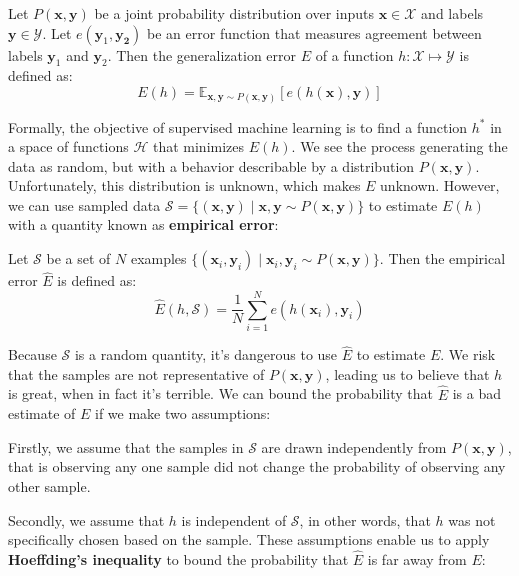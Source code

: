 \begin{definition} \label{generalisation_error}
	Let $P(\mathbf{x}, \mathbf{y})$ be a joint probability distribution over inputs $\mathbf{x} \in \mathcal{X}$ and labels $\mathbf{y} \in \mathcal{Y}$. Let $e(\mathbf{y}_1, \mathbf{y_2})$ be an error function that measures agreement between labels $\mathbf{y}_1$ and $\mathbf{y}_2$. Then the generalization error $E$ of a function $h: \mathcal{X} \mapsto \mathcal{Y}$ is defined as:
	$$
		E(h) = \mathbb{E}_{\mathbf{x},\mathbf{y}\sim P(\mathbf{x}, \mathbf{y})}[e(h(\mathbf{x}), \mathbf{y})]
	$$
\end{definition}
Formally, the objective of supervised machine learning is to find a function $h^*$ in a space of functions $\mathcal{H}$ that minimizes $E(h)$. We see the process generating the data as random, but with a behavior describable by a distribution $P(\mathbf{x}, \mathbf{y})$. Unfortunately, this distribution is unknown, which makes $E$ unknown. However, we can use sampled data $\mathcal{S} = \{(\mathbf{x}, \mathbf{y}) \mid \mathbf{x}, \mathbf{y} \sim P(\mathbf{x}, \mathbf{y})\}$ to estimate $E(h)$ with a quantity known as \textbf{empirical error}:

\begin{definition} \label{empirical_error}
	Let $\mathcal{S}$ be a set of $N$ examples $\{(\mathbf{x}_i, \mathbf{y}_i) \mid \mathbf{x}_i, \mathbf{y}_i \sim P(\mathbf{x}, \mathbf{y})\}$. Then the empirical error $\hat{E}$ is defined as:
	$$
		\hat{E}(h, \mathcal{S}) = \frac{1}{N}\sum\limits_{i=1}^N e(h(\mathbf{x}_i), \mathbf{y}_i)
	$$
\end{definition}

Because $\mathcal{S}$ is a random quantity, it's dangerous to use $\hat{E}$ to estimate $E$. We risk that the samples are not representative of $P(\mathbf{x}, \mathbf{y})$, leading us to believe that $h$ is great, when in fact it's terrible. We can bound the probability that $\hat{E}$ is a bad estimate of $E$ if we make two assumptions:

Firstly, we assume that the samples in $\mathcal{S}$ are drawn independently from $P(\mathbf{x}, \mathbf{y})$, that is observing any one sample did not change the probability of observing any other sample.

Secondly, we assume that $h$ is independent of $\mathcal{S}$, in other words, that $h$ was not specifically chosen based on the sample. These assumptions enable us to apply \textbf{Hoeffding's inequality} to bound the probability that $\hat{E}$ is far away from $E$:

